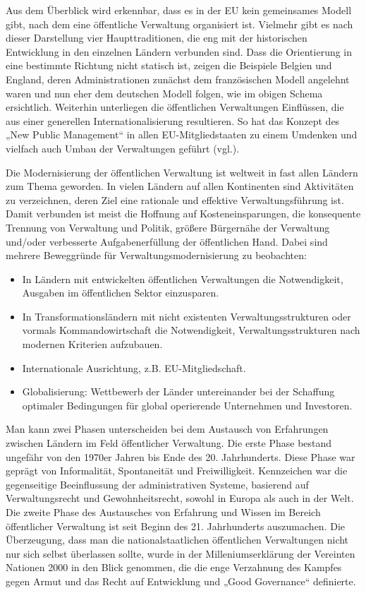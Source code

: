Aus dem Überblick wird erkennbar, dass es in der EU kein gemeinsames Modell gibt, nach dem eine öffentliche Verwaltung organisiert ist. Vielmehr gibt es nach dieser Darstellung vier Haupttraditionen, die eng mit der historischen Entwicklung in den einzelnen Ländern verbunden sind. Dass die Orientierung in eine bestimmte Richtung nicht statisch ist, zeigen die Beispiele Belgien und England, deren Administrationen zunächst dem französischen Modell angelehnt waren und nun eher dem deutschen Modell folgen, wie im obigen Schema ersichtlich. Weiterhin unterliegen die öffentlichen Verwaltungen Einflüssen, die aus einer generellen Internationalisierung resultieren. So hat das Konzept des „New Public Management“ in allen EU-Mitgliedstaaten zu einem Umdenken und vielfach auch Umbau der Verwaltungen geführt (vgl.\cite{dunhoo}).
\par
Die Modernisierung der öffentlichen Verwaltung ist weltweit in fast allen Ländern zum Thema geworden. In vielen Ländern auf allen Kontinenten sind Aktivitäten zu verzeichnen, deren Ziel eine rationale und effektive Verwaltungsführung ist. Damit verbunden ist meist die Hoffnung auf Kosteneinsparungen, die konsequente Trennung von Verwaltung und Politik, größere Bürgernähe der Verwaltung und/oder verbesserte Aufgabenerfüllung der öffentlichen Hand. Dabei sind mehrere Beweggründe für Verwaltungsmodernisierung zu beobachten:
\par
\begin{itemize} \itemsep1pt \parskip0pt 
\item In Ländern mit entwickelten öffentlichen Verwaltungen die Notwendigkeit, Ausgaben im öffentlichen Sektor einzusparen.
\item In Transformationsländern mit nicht existenten Verwaltungsstrukturen oder vormals Kommandowirtschaft die Notwendigkeit, Verwaltungsstrukturen nach modernen Kriterien aufzubauen.
\item Internationale Ausrichtung, z.B. EU-Mitgliedschaft.
\item Globalisierung: Wettbewerb der Länder untereinander bei der Schaffung optimaler Bedingungen für global operierende Unternehmen und Investoren.
\end{itemize}
Man kann zwei Phasen unterscheiden bei dem Austausch von Erfahrungen zwischen Ländern im Feld öffentlicher Verwaltung. Die erste Phase bestand ungefähr von den 1970er Jahren bis Ende des 20. Jahrhunderts. Diese Phase war geprägt von Informalität, Spontaneität und Freiwilligkeit. Kennzeichen war die gegenseitige Beeinflussung der administrativen Systeme, basierend auf Verwaltungsrecht und Gewohnheitsrecht, sowohl in Europa als auch in der Welt. Die zweite Phase des Austausches von Erfahrung und Wissen im Bereich öffentlicher Verwaltung ist seit Beginn des 21. Jahrhunderts auszumachen. Die Überzeugung, dass man die nationalstaatlichen öffentlichen Verwaltungen nicht nur sich selbst überlassen sollte, wurde in der Milleniumserklärung der Vereinten Nationen 2000 in den Blick genommen, die die enge Verzahnung des Kampfes gegen Armut und das Recht auf Entwicklung und „Good Governance“ definierte. 

